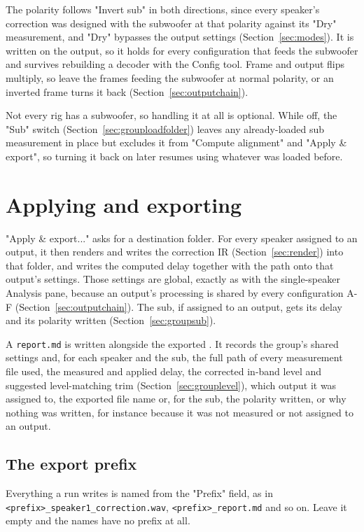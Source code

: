 The polarity follows "Invert sub" in both directions, since every speaker's correction was designed with the subwoofer at that polarity against its "Dry" measurement, and "Dry" bypasses the output settings (Section~\ref{sec:modes}). It is written on the output, so it holds for every configuration that feeds the subwoofer and survives rebuilding a decoder with the Config tool. Frame and output flips multiply, so leave the frames feeding the subwoofer at normal polarity, or an inverted frame turns it back (Section~\ref{sec:outputchain}).

Not every rig has a subwoofer, so handling it at all is optional. While off, the "Sub" switch (Section~\ref{sec:grouploadfolder}) leaves any already-loaded sub measurement in place but excludes it from "Compute alignment" and "Apply \& export", so turning it back on later resumes using whatever was loaded before.

\section{Applying and exporting}
"Apply \& export..." asks for a destination folder. For every speaker assigned to an output, it then renders and writes the correction IR (Section~\ref{sec:render}) into that folder, and writes the computed delay together with the  path onto that output's settings. Those settings are global, exactly as with the single-speaker Analysis pane, because an output's processing is shared by every configuration A-F (Section~\ref{sec:outputchain}). The sub, if assigned to an output, gets its delay and its polarity written (Section~\ref{sec:groupsub}).

A \texttt{report.md} is written alongside the exported . It records the group's shared settings and, for each speaker and the sub, the full path of every measurement file used, the measured and applied delay, the corrected in-band level and suggested level-matching trim (Section~\ref{sec:grouplevel}), which output it was assigned to, the exported file name or, for the sub, the polarity written, or why nothing was written, for instance because it was not measured or not assigned to an output.

\subsection{The export prefix}\label{sec:groupprefix}
Everything a run writes is named from the "Prefix" field, as in \texttt{<prefix>\_speaker1\_correction.wav}, \texttt{<prefix>\_report.md} and so on. Leave it empty and the names have no prefix at all.

